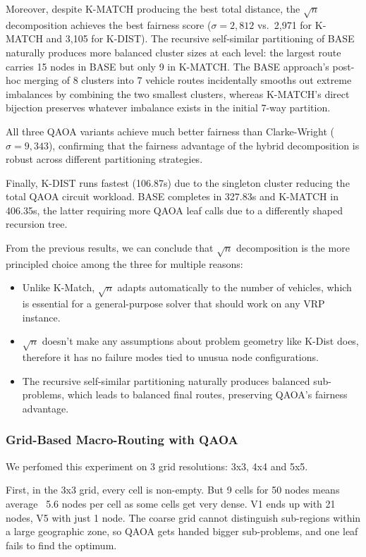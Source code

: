 \documentclass[a4paper]{report}
\begin{document}
{\begin{itemize}
\begin{itemize}
Moreover, despite K-MATCH producing the best total distance, the $\sqrt{n}$ decomposition achieves the best fairness score ($\sigma = 2{,}812$ vs.\ 2{,}971 for K-MATCH and 3{,}105 for K-DIST). The recursive self-similar partitioning of BASE naturally produces more balanced cluster sizes at each level: the largest route carries 15 nodes in BASE but only 9 in K-MATCH. The BASE approach's post-hoc merging of 8 clusters into 7 vehicle routes incidentally smooths out 
extreme imbalances by combining the two smallest clusters, whereas K-MATCH's direct bijection preserves whatever imbalance exists in the initial 7-way partition.

All three QAOA variants achieve much better fairness than Clarke-Wright ($\sigma = 9{,}343$), confirming that the fairness advantage of the hybrid decomposition is robust across different partitioning strategies.

Finally, K-DIST runs fastest (106.87s) due to the singleton cluster reducing the total QAOA circuit workload. BASE completes in 327.83s and K-MATCH in 406.35s, the latter requiring more QAOA leaf calls due to a differently shaped recursion tree. 

From the previous results, we can conclude that $\sqrt{n}$ decomposition is the more principled choice among the three for multiple reasons:
\begin{itemize}
    \item Unlike K-Match, $\sqrt{n}$ adapts automatically to the number of vehicles, which is essential for a general-purpose solver that should work on any VRP instance.
    \item $\sqrt{n}$ doesn't make any assumptions about problem geometry like K-Dist does, therefore it has no failure modes tied to unusua node configurations.
    \item The recursive self-similar partitioning naturally produces balanced sub-problems, which leads to balanced final routes, preserving QAOA's fairness advantage. 
\end{itemize}



\subsubsection{ Grid-Based Macro-Routing with QAOA}

We perfomed this experiment on 3 grid resolutions: 3x3, 4x4 and 5x5.

First, in the 3x3 grid, every cell is non-empty. But 9 cells for 50 nodes means average ~5.6 nodes per cell as some cells get very dense. V1 ends up with 21 nodes, V5 with just 1 node. The coarse grid cannot distinguish sub-regions within a large geographic zone, so QAOA gets handed bigger sub-problems, and one leaf fails to find the optimum. 


\end{itemize}
\end{itemize}}
\end{document}
